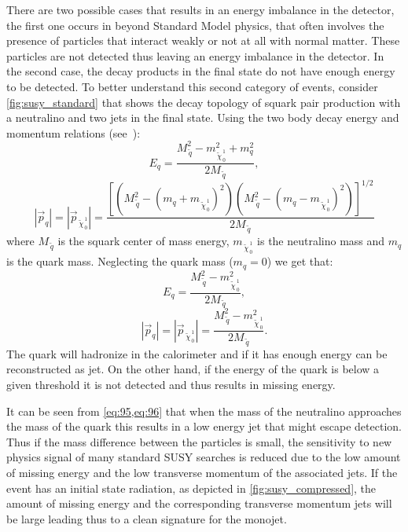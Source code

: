 There are two possible cases that results in an energy imbalance in the
detector, the first one occurs in beyond Standard Model physics, that often
involves the presence of particles that interact weakly or not at all with
normal matter. These particles are not detected thus leaving an energy imbalance
in the detector. In the second case, the decay products in the final state do
not have enough energy to be detected. To better understand this second category
of events, consider \cref{fig:susy_standard} that shows the decay topology of
squark pair production with a neutralino and two jets in the final state. Using
the two body decay energy and momentum relations (see~\cite{PDG}):
\begin{equation}
  \label{eq:93}
  E_q = \frac{M_{\, \tilde{q}}^2 - m_{\, \tilde{\chi}_{\, 0}^{\, 1}}^2 + m_q^2}{2
    M_{\, \tilde{q}}},
\end{equation}
\begin{equation}
  \label{eq:94}
  |\vec{p}_q| = |\vec{p}_{\, \tilde{\chi}_{\, 0}^{\, 1}}| = \frac{\left[ \left(
        M_{\, \tilde{q}}^2 - (m_q + m_{\, \tilde{\chi}_{\, 0}^{\, 1}})^2
      \right) \left( M_{\, \tilde{q}}^2 - (m_q - m_{\, \tilde{\chi}_{\, 0}^{\,
            1}})^2 \right) \right]^{1/2}}{2 M_{\, \tilde{q}}}
\end{equation}
where $M_{\, \tilde{q}}$ is the squark center of mass energy,
$m_{\, \tilde{\chi}_{\, 0}^{\, 1}}$ is the neutralino mass and $m_q$ is the
quark mass. Neglecting the quark mass ($m_q = 0$) we get that:
\begin{equation}
  \label{eq:95}
  E_q = \frac{M_{\, \tilde{q}}^2 - m_{\, \tilde{\chi}_{\, 0}^{\, 1}}^2}{2 M_{\,
      \tilde{q}}},
\end{equation}
\begin{equation}
  \label{eq:96}
  |\vec{p}_q| = |\vec{p}_{\, \tilde{\chi}_{\, 0}^{\, 1}}| = \frac{M_{\,
      \tilde{q}}^2 - m_{\, \tilde{\chi}_{\, 0}^{\, 1}}^2}{2 M_{\, \tilde{q}}}.
\end{equation}
The quark will hadronize in the calorimeter and if it has enough energy can be
reconstructed as jet. On the other hand, if the energy of the quark is below a
given threshold it is not detected and thus results in missing energy.

It can be seen from \cref{eq:95,eq:96} that when the mass of the neutralino
approaches the mass of the quark this results in a low energy jet that might
escape detection. Thus if the mass difference between the particles is small,
the sensitivity to new physics signal of many standard SUSY searches is reduced
due to the low amount of missing energy and the low transverse momentum of the
associated jets. If the event has an initial state radiation, as depicted in
\cref{fig:susy_compressed}, the amount of missing energy and the corresponding
transverse momentum jets will be large leading thus to a clean signature for the
monojet.

